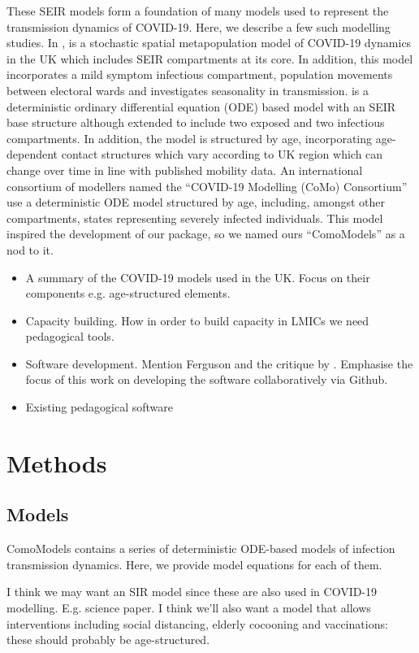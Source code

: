 \documentclass[]{article}
\begin{document}
These SEIR models form a foundation of many models used to represent the transmission dynamics of COVID-19. Here, we describe a few such modelling studies.  In \cite{danon2020spatial}, is a stochastic spatial metapopulation model of COVID-19 dynamics in the UK which includes SEIR compartments at its core. In addition, this model incorporates a mild symptom infectious compartment, population movements between electoral wards and investigates seasonality in transmission. \cite{birrell2021real} is a deterministic ordinary differential equation (ODE) based model with an SEIR base structure although extended to include two exposed and two infectious compartments. In addition, the model is structured by age, incorporating age-dependent contact structures which vary according to UK region which can change over time in line with published mobility data. An international consortium of modellers named the ``COVID-19 Modelling (CoMo) Consortium'' \citep{aguas2020modelling} use a deterministic ODE model structured by age, including, amongst other compartments, states representing severely infected individuals. This model inspired the development of our package, so we named ours ``ComoModels'' as a nod to it.



\begin{itemize}
	\item A summary of the COVID-19 models used in the UK. Focus on their components e.g. age-structured elements.
	\item Capacity building. How in order to build capacity in LMICs we need pedagogical tools.
	\item Software development. Mention Ferguson and the critique by \cite{horner2020software}. Emphasise the focus of this work on developing the software collaboratively via Github.
	\item Existing pedagogical software
\end{itemize}

\section{Methods}
\subsection{Models}
ComoModels contains a series of deterministic ODE-based models of infection transmission dynamics. Here, we provide model equations for each of them.

I think we may want an SIR model since these are also used in COVID-19 modelling. E.g. science paper. I think we'll also want a model that allows interventions including social distancing, elderly cocooning and vaccinations: these should probably be age-structured.
\end{document}
